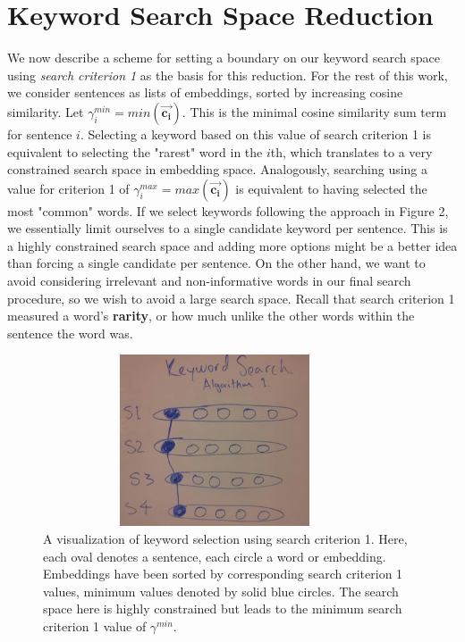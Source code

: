 \documentclass[12pt]{article}
\begin{document}
\section{Keyword Search Space Reduction}

We now describe a scheme for setting a boundary on our keyword search space using \textit{search criterion 1} as the basis for this reduction. For the rest of this work, we consider sentences as lists of embeddings, sorted by increasing cosine similarity. Let $\gamma_{i}^{min}= min(\bm{\vec{c_i}})$. This is the minimal cosine similarity sum term for sentence $i$. Selecting a keyword based on this value of search criterion 1 is equivalent to selecting the "rarest" word in the $i$th, which translates to a very constrained search space in embedding space. Analogously, searching using a value for criterion 1 of $\gamma_{i}^{max} = max(\bm{\vec{c_i}})$ is equivalent to having selected the most "common" words. If we select keywords following the approach in Figure 2, we essentially limit ourselves to a single candidate keyword per sentence. This is a highly constrained search space and adding more options might be a better idea than forcing a single candidate per sentence. On the other hand, we want to avoid considering irrelevant and non-informative words in our final search procedure, so we wish to avoid a large search space. Recall that search criterion 1 measured a word's \textbf{rarity}, or how much unlike the other words within the sentence the word was.

\begin{figure}[H]
\centering
\includegraphics[height=2in, width=4in]{Images/KeywordSearchAlg1.png}
\caption{A visualization of keyword selection using search criterion 1. Here, each oval denotes a sentence, each circle a word or embedding. Embeddings have been sorted by corresponding search criterion 1 values, minimum values denoted by solid blue circles. The search space here is highly constrained but leads to the minimum search criterion 1 value of $\gamma^{min}$.}
\end{figure}
\end{document}
